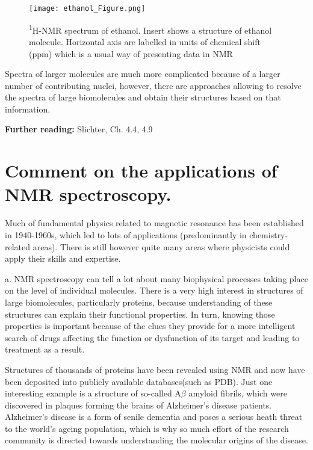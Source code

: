 \documentclass[a4paper, 12pt]{article}
\begin{document}
\begin{figure}[h]
\caption{\textsuperscript{1}H-NMR spectrum of ethanol. Insert shows a structure of ethanol molecule. Horizontal axis are labelled in units of chemical shift (ppm) which is a usual way of presenting data in NMR}
\label{fig:ethanol}
\centering
\texttt{[image: ethanol\_Figure.png]}
\end{figure}

  Spectra of larger molecules are much more complicated because of a larger number of contributing nuclei, however, there are approaches allowing to  resolve the spectra of large biomolecules and obtain their structures based on that information.
  
\textbf{Further reading:} Slichter, Ch. 4.4, 4.9 

\section{Comment on the applications of NMR spectroscopy.}

Much of fundamental physics related to magnetic resonance has been established in 1940-1960s, which led to lots of applications (predominantly in chemistry-related areas). There is still however quite many areas where physicists could apply their skills and expertise.
 
a. NMR spectroscopy can tell a lot about many biophysical processes taking place on the level of individual molecules. There is a very high interest in structures of large biomolecules, particularly proteins, because understanding of these structures can explain their functional properties. In turn, knowing those properties is important because of the clues they provide  for a more intelligent search of drugs affecting the function or dysfunction of its target and leading to treatment as a result.

Structures of thousands of proteins have been revealed using NMR and now have been deposited into publicly available databases(such as PDB). Just one interesting example is a structure of so-called A$\beta$ amyloid fibrils, which were discovered in plaques forming the brains of Alzheimer's disease patients. Alzheimer's disease is a form of senile dementia and poses a serious heath threat to the world's ageing population, which is why so much effort of the research community is directed towards understanding the molecular origins of the disease. 
\end{document}
